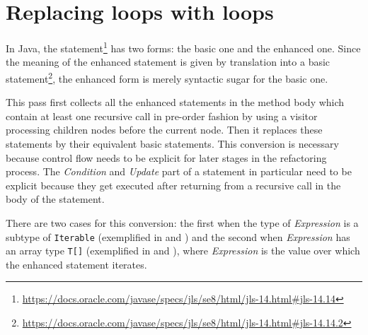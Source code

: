 \section{Replacing  loops with  loops}

In Java, the  statement\footnote{\url{https://docs.oracle.com/javase/specs/jls/se8/html/jls-14.html#jls-14.14}}
has two forms: the basic one and the enhanced one. Since the meaning of the enhanced  statement is given by
translation into a basic  statement\footnote{\url{https://docs.oracle.com/javase/specs/jls/se8/html/jls-14.html#jls-14.14.2}},
the enhanced form is merely syntactic sugar for the basic one.

This pass first collects all the enhanced  statements in the method body which contain at least one recursive
call in pre-order fashion by using a visitor processing children nodes before the current node. Then it replaces these
statements by their equivalent basic  statements. This conversion is necessary because control flow needs to
be explicit for later stages in the refactoring process. The \textit{Condition} and \textit{Update} part of a 
statement in particular need to be explicit because they get executed after returning from a recursive call in the body
of the  statement.

There are two cases for this conversion: the first when the type of \textit{Expression} is a subtype of
\texttt{Iterable} (exemplified in  and
) and the second when \textit{Expression} has an array type
\texttt{T[]} (exemplified in  and
), where \textit{Expression} is the value over which the
enhanced  statement iterates.

